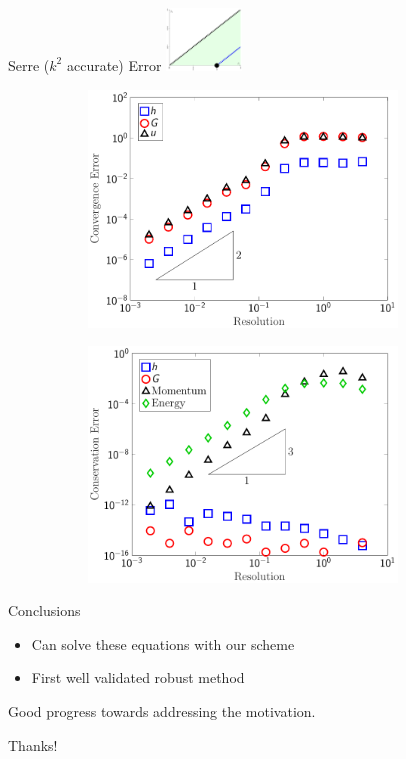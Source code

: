 \documentclass[pdf]{beamer}
\begin{document}
\begin{frame}{
	Serre ($k^2$ accurate) Error \hfill \hfill \hfill \hfill \includegraphics[width=2cm]{./Pics/Tex/Explanatory/MiniRegions/Serre.pdf}}
\begin{figure}
	\centering
	\begin{subfigure}{0.49\textwidth}
		\includegraphics[width=0.9\textwidth]{./Pics/Tex/Results/Validation/Soliton/Convergence.pdf}
	\end{subfigure}
	\begin{subfigure}{0.49\textwidth}
		\includegraphics[width=0.9\textwidth]{./Pics/Tex/Results/Validation/Soliton/Conservation.pdf}
	\end{subfigure}
\end{figure}
\end{frame}


\begin{frame}{Conclusions}
\begin{itemize}
	\item Can solve these equations with our scheme
	\item First well validated robust method
\end{itemize}
Good progress towards addressing the motivation. 
\end{frame}


\begin{frame}
Thanks!
\end{frame}
\end{document}
